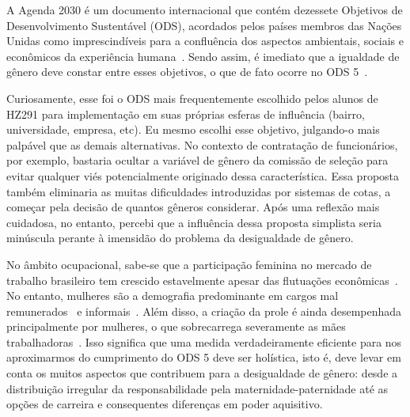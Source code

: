 \documentclass[
    article,
    11pt,
    oneside,
    a4paper,
    english,
    brazil,
    sumario=tradicional
    ]{abntex2}
\begin{document}

\frenchspacing

\maketitle

\textual

A Agenda 2030 é um documento internacional que contém dezessete Objetivos de
Desenvolvimento Sustentável (ODS), acordados pelos países membros das Nações
Unidas como imprescindíveis para a confluência dos aspectos ambientais, sociais
e econômicos da experiência humana~\cite{unitednations}. Sendo assim, é
imediato que a igualdade de gênero deve constar entre esses objetivos, o que de
fato ocorre no ODS 5~\cite{ods5}.

Curiosamente, esse foi o ODS mais frequentemente escolhido pelos alunos de
HZ291 para implementação em suas próprias esferas de influência (bairro,
universidade, empresa, etc). Eu mesmo escolhi esse objetivo, julgando-o mais
palpável que as demais alternativas. No contexto de contratação de
funcionários, por exemplo, bastaria ocultar a variável de gênero da comissão de
seleção para evitar qualquer viés potencialmente originado dessa
característica. Essa proposta também eliminaria as muitas dificuldades
introduzidas por sistemas de cotas, a começar pela decisão de quantos gêneros
considerar. Após uma reflexão mais cuidadosa, no entanto, percebi que a
influência dessa proposta simplista seria minúscula perante à imensidão do
problema da desigualdade de gênero.

No âmbito ocupacional, sabe-se que a participação feminina no mercado de
trabalho brasileiro tem crescido estavelmente apesar das flutuações
econômicas~\cite{Lavinas2001}. No entanto, mulheres são a demografia
predominante em cargos mal remunerados~\cite{Barros1997, Araujo2001} e
informais~\cite{Cristina2007}. Além disso, a criação da prole é ainda
desempenhada principalmente por mulheres, o que sobrecarrega severamente as
mães trabalhadoras~\cite{Cristina2007}. Isso significa que uma medida
verdadeiramente eficiente para nos aproximarmos do cumprimento do ODS 5 deve
ser holística, isto é, deve levar em conta os muitos aspectos que contribuem
para a desigualdade de gênero: desde a distribuição irregular da
responsabilidade pela maternidade-paternidade até as opções de carreira e
consequentes diferenças em poder aquisitivo.

\pagebreak

\postextual


\end{document}
